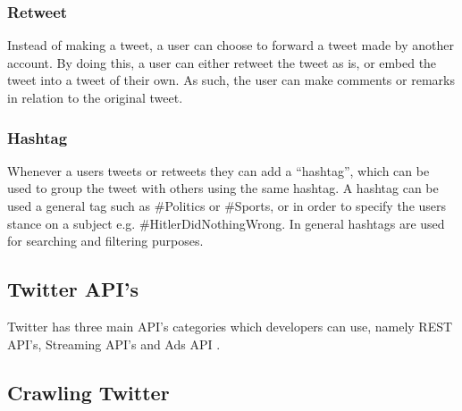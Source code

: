\subsubsection{Retweet}
Instead of making a tweet, a user can choose to forward a tweet made by another
account. By doing this, a user can either retweet the tweet as is, or embed the
tweet into a tweet of their own. As such, the user can make comments or remarks
in relation to the original tweet.

\subsubsection{Hashtag}
Whenever a users tweets or retweets they can add a ``hashtag'', which can be
used to group the tweet with others using the same hashtag. A hashtag can be
used a general tag such as \#Politics or \#Sports, or in order to specify the
users stance on a subject e.g. \#HitlerDidNothingWrong. In general hashtags are
used for searching and filtering purposes.

\subsection{Twitter API's}
Twitter has three main API's categories which developers can use, namely REST
API's, Streaming API's and Ads API \citep{TwitterDevDocs}.


\subsection{Crawling Twitter}
